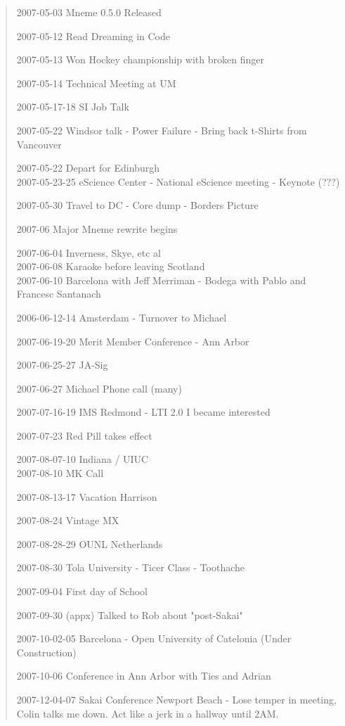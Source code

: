 \begin{quote}
2007-05-03 Mneme 0.5.0 Released

2007-05-12 Read Dreaming in Code

2007-05-13 Won Hockey championship with broken finger

2007-05-14 Technical Meeting at UM

2007-05-17-18 SI Job Talk

2007-05-22 Windsor talk - Power Failure - Bring back t-Shirts from Vancouver

2007-05-22 Depart for Edinburgh\\
2007-05-23-25 eScience Center - National eScience meeting - Keynote (???)

2007-05-30 Travel to DC - Core dump - Borders Picture

2007-06 Major Mneme rewrite begins

2007-06-04 Inverness, Skye, etc al\\
2007-06-08 Karaoke before leaving Scotland\\

2007-06-10 Barcelona with Jeff Merriman - Bodega with Pablo and Francesc Santanach

2006-06-12-14 Amsterdam - Turnover to Michael

2007-06-19-20 Merit Member Conference - Ann Arbor

2007-06-25-27 JA-Sig

2007-06-27 Michael Phone call (many)

2007-07-16-19 IMS Redmond - LTI 2.0 I became interested

2007-07-23 Red Pill takes effect

2007-08-07-10 Indiana / UIUC\\
2007-08-10 MK Call

2007-08-13-17 Vacation Harrison

2007-08-24 Vintage MX

2007-08-28-29 OUNL Netherlands

2007-08-30 Tola University - Ticer Class - Toothache

2007-09-04 First day of School

2007-09-30 (appx) Talked to Rob about "post-Sakai"

2007-10-02-05 Barcelona - Open University of Catelonia (Under Construction)

2007-10-06 Conference in Ann Arbor with Ties and Adrian

2007-12-04-07 Sakai Conference Newport Beach - 
Lose temper in meeting, Colin talks me down.
Act like a jerk in a hallway until 2AM.


\end{quote}
